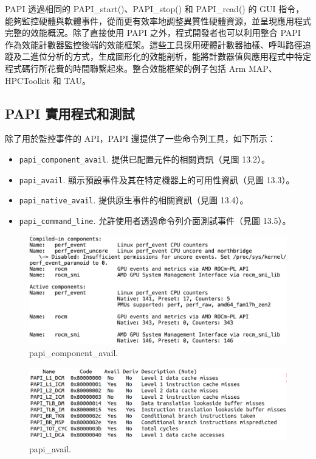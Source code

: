 PAPI 透過相同的 PAPI\_start()、PAPI\_stop() 和 PAPI\_read() 的 GUI 指令，能夠監控硬體與軟體事件，從而更有效率地調整異質性硬體資源，並呈現應用程式完整的效能概況。除了直接使用 PAPI 之外，程式開發者也可以利用整合 PAPI 作為效能計數器監控後端的效能框架。這些工具採用硬體計數器抽樣、呼叫路徑追蹤及二進位分析的方式，生成圖形化的效能剖析，能將計數器值與應用程式中特定程式碼行所花費的時間聯繫起來。整合效能框架的例子包括 Arm MAP、HPCToolkit 和 TAU。


\subsection{PAPI 實用程式和測試}

除了用於監控事件的 API，PAPI 還提供了一些命令列工具，如下所示：
\begin{itemize}
    \item \texttt{papi\_component\_avail}. 提供已配置元件的相關資訊（見圖 13.2）。
    \item \texttt{papi\_avail}. 顯示預設事件及其在特定機器上的可用性資訊（見圖 13.3）。
    \item \texttt{papi\_native\_avail}. 提供原生事件的相關資訊（見圖 13.4）。
    \item \texttt{papi\_command\_line}. 允許使用者透過命令列介面測試事件（見圖 13.5）。
\end{itemize}

\begin{figure}
    \centering
    \includegraphics[width=0.9\linewidth]{FileAusiliari/Screenshots/Figure13-2.png}
    \caption{papi_component_avail.}
    \label{fig:PAPI2}
\end{figure}

\begin{figure}
    \centering
    \includegraphics[width=0.9\linewidth]{FileAusiliari/Screenshots/Figure13-3.png}
    \caption{papi_avail.}
    \label{fig:PAPI3}
\end{figure}

